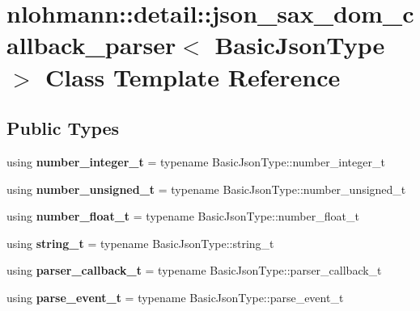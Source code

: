 \hypertarget{classnlohmann_1_1detail_1_1json__sax__dom__callback__parser}{}\section{nlohmann\+:\+:detail\+:\+:json\+\_\+sax\+\_\+dom\+\_\+callback\+\_\+parser$<$ Basic\+Json\+Type $>$ Class Template Reference}
\label{classnlohmann_1_1detail_1_1json__sax__dom__callback__parser}
\subsection*{Public Types}
\begin{DoxyCompactItemize}
\item 
\mbox{\label{classnlohmann_1_1detail_1_1json__sax__dom__callback__parser_a3ba8fc7a8d83c5b0eeb3b543ad844b8d}} 
using {\bfseries number\+\_\+integer\+\_\+t} = typename Basic\+Json\+Type\+::number\+\_\+integer\+\_\+t
\item 
\mbox{\label{classnlohmann_1_1detail_1_1json__sax__dom__callback__parser_a2406c5125f7128fb9c01921df2903001}} 
using {\bfseries number\+\_\+unsigned\+\_\+t} = typename Basic\+Json\+Type\+::number\+\_\+unsigned\+\_\+t
\item 
\mbox{\label{classnlohmann_1_1detail_1_1json__sax__dom__callback__parser_a914ea0555cea5290449fb791ae41c655}} 
using {\bfseries number\+\_\+float\+\_\+t} = typename Basic\+Json\+Type\+::number\+\_\+float\+\_\+t
\item 
\mbox{\label{classnlohmann_1_1detail_1_1json__sax__dom__callback__parser_a00e7d95d82d5d8a43421526a42a8eabc}} 
using {\bfseries string\+\_\+t} = typename Basic\+Json\+Type\+::string\+\_\+t
\item 
\mbox{\label{classnlohmann_1_1detail_1_1json__sax__dom__callback__parser_a4f636086fa8e7cf26c35c8afd50903ce}} 
using {\bfseries parser\+\_\+callback\+\_\+t} = typename Basic\+Json\+Type\+::parser\+\_\+callback\+\_\+t
\item 
\mbox{\label{classnlohmann_1_1detail_1_1json__sax__dom__callback__parser_aac6d706967b2ecc2510e172577d8550b}} 
using {\bfseries parse\+\_\+event\+\_\+t} = typename Basic\+Json\+Type\+::parse\+\_\+event\+\_\+t
\end{DoxyCompactItemize}
